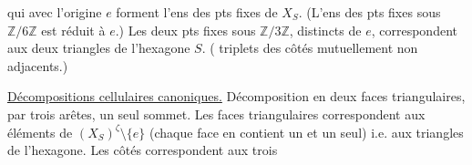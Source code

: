 
qui avec l'origine $e$ forment l'ens des pts fixes de $X_S$. (L'ens des pts fixes sous $\mathbb Z/6\mathbb Z$ est réduit à $e$.) Les deux pts fixes sous $\mathbb Z/3\mathbb Z$, distincts de $e$, correspondent aux deux triangles  de l'hexagone $S$. ( triplets des côtés mutuellement non adjacents.)

\uline{Décompositions cellulaires canoniques.} Décomposition en deux faces triangulaires, par trois arêtes, un seul sommet. Les faces triangulaires correspondent aux éléments de $(X_S)^\zeta\setminus\{e\}$ (chaque face en contient un et un seul) i.e. aux triangles  de l'hexagone. Les côtés correspondent aux trois


